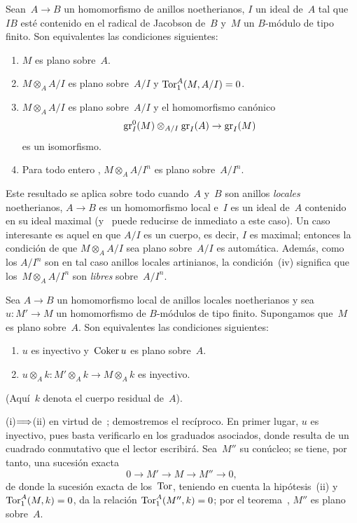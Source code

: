 \begin{theoreme}
\label{IV.5.6}
Sean~$A\to B$ un homomorfismo de anillos noetherianos, $I$ un ideal de~$A$
tal que~$IB$ esté contenido en el radical de Jacobson de~$B$ y~$M$ un
$B$-módulo de tipo finito. Son equivalentes las condiciones siguientes:
\begin{enumerate}
\item[(i)] $M$ es plano sobre~$A$.
\item[(ii)] $M\otimes_A A/I$ es plano sobre~$A/I$ y
$\operatorname{Tor}_1^A(M,A/I)=0$.
\item[(iii)] $M\otimes_A A/I$ es plano sobre~$A/I$ y el homomorfismo
canónico
$$
\operatorname{gr}_I^0(M)\otimes_{A/I}\operatorname{gr}_I(A)\to\operatorname{gr}_I(M)
$$
es un isomorfismo.
\item[(iv)] Para todo entero
, $M\otimes_A A/I^n$ es plano
sobre~$A/I^n$.
\end{enumerate}
\end{theoreme}

Este resultado se aplica sobre todo cuando~$A$ y~$B$ son anillos
\emph{locales} noetherianos, $A\to B$ es un homomorfismo local e~$I$ es
un ideal de~$A$ contenido en su ideal maximal (y~ puede
reducirse de inmediato a este caso). Un caso interesante es aquel en que
$A/I$ es un cuerpo, es decir, $I$ es maximal; entonces la condición de que
$M\otimes_A A/I$ sea plano sobre~$A/I$ es automática. Además, como los
$A/I^n$ son en tal caso anillos locales artinianos, la condición~(iv)
significa que los~$M\otimes_A A/I^n$ son \emph{libres} sobre~$A/I^n$.

\begin{corollaire}
\label{IV.5.7}
Sea
$A\to B$ un homomorfismo local de anillos locales noetherianos y sea
$u\colon M'\to M$ un homomorfismo de $B$-módulos de tipo finito.
Supongamos que~$M$ es plano sobre~$A$. Son equivalentes las condiciones
siguientes:
\begin{enumerate}
\item[(i)] $u$ es inyectivo y~$\operatorname{Coker} u$ es plano sobre~$A$.
\item[(ii)] $u\otimes_A k\colon M'\otimes_A k\to M\otimes_A k$ es
inyectivo.
\end{enumerate}
(Aquí~$k$ denota el cuerpo residual de~$A$).
\end{corollaire}

(i)$\Longrightarrow$(ii) en virtud de~; demostremos el recíproco. En
primer lugar, $u$ es inyectivo, pues basta verificarlo en los graduados
asociados, donde resulta de un cuadrado conmutativo que el lector
escribirá. Sea~$M''$ su conúcleo; se tiene, por tanto, una sucesión exacta
$$
0\to M'\to M\to M''\to0,
$$
de donde la sucesión exacta de los~$\operatorname{Tor}$, teniendo en cuenta la
hipótesis~(ii) y~$\operatorname{Tor}_1^A(M,k)=0$, da la relación
$\operatorname{Tor}_1^A(M'',k)=0$; por el teorema~, $M''$ es plano
sobre~$A$.

